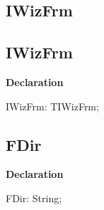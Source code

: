 \documentclass{report}
\newif\ifpdf
\begin{document}
\subsection*{\large{\textbf{IWizFrm}}\normalsize\hspace{1ex}\hrulefill}
\else
\subsection*{IWizFrm}
\fi
\label{mainunit-IWizFrm}
\begin{list}{}{
\setlength{\itemindent}{0cm}
\setlength{\listparindent}{0cm}
\setlength{\leftmargin}{\evensidemargin}
\addtolength{\leftmargin}{\tmplength}
\settowidth{\labelsep}{X}
\addtolength{\leftmargin}{\labelsep}
\setlength{\labelwidth}{\tmplength}
}
\item[\textbf{Declaration}\hfill]
\ifpdf
\begin{flushleft}
\fi
\begin{ttfamily}
IWizFrm: TIWizFrm;\end{ttfamily}

\ifpdf
\end{flushleft}
\fi

\end{list}
\ifpdf
\subsection*{\large{\textbf{FDir}}\normalsize\hspace{1ex}\hrulefill}
\else
\subsection*{FDir}
\fi
\label{mainunit-FDir}
\begin{list}{}{
\setlength{\itemindent}{0cm}
\setlength{\listparindent}{0cm}
\setlength{\leftmargin}{\evensidemargin}
\addtolength{\leftmargin}{\tmplength}
\settowidth{\labelsep}{X}
\addtolength{\leftmargin}{\labelsep}
\setlength{\labelwidth}{\tmplength}
}
\item[\textbf{Declaration}\hfill]
\ifpdf
\begin{flushleft}
\fi
\begin{ttfamily}
FDir:  String;\end{ttfamily}

\ifpdf
\end{flushleft}
\fi

\end{list}
\ifpdf
\end{document}
